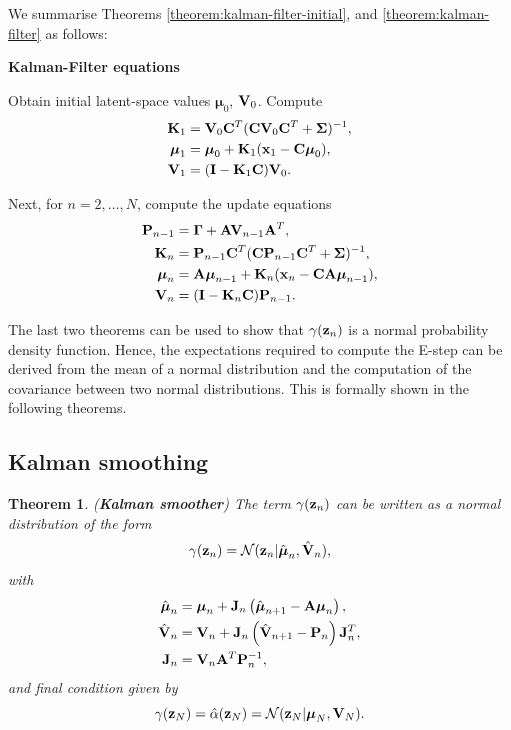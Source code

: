 \documentclass[12pt, oneside]{book}
\numberwithin{equation}{section}
\newcommand{\x}{{\bf x}}
\newcommand{\z}{{\bf z}}
\newcommand{\N}{\mathcal{N}}
\newtheorem{theorem}{Theorem}[section]
\begin{document}
{We summarise Theorems \ref{theorem:kalman-filter-initial}, and \ref{theorem:kalman-filter} as follows:
\begin{tcolorbox}
\textbf{Kalman-Filter equations}

	Obtain initial latent-space values $\boldsymbol{\mu}_0$, ${\bf V}_0$. Compute
	\begin{align}
		{\bf K}_1 &= {\bf V}_0{\bf C}^T({\bf C} {\bf V}_0 {\bf C}^T + \boldsymbol\Sigma)^{-1},\\
		\boldsymbol{\mu}_1 &= \boldsymbol{\mu}_0 + {\bf K}_1(\x_1 -{\bf C}\boldsymbol\mu_0),\\
		{\bf V}_1 &=  ({\bf I} - {\bf K}_1{\bf C}){\bf V}_0.
	\end{align}

	Next, for $n=2, \ldots, N$, compute the update equations
	\begin{align}
		{\bf P}_{n-1} &= \boldsymbol{\Gamma} + {\bf A}{\bf V}_{n-1}{\bf A}^T,\\
		{\bf K}_n &= {\bf P}_{n-1}{\bf C}^T({\bf C} {\bf P}_{n-1}{\bf C}^T + \boldsymbol\Sigma)^{-1},\\
		\boldsymbol{\mu}_n &= {\bf A}\boldsymbol{\mu}_{n-1} + {\bf K}_n(\x_n -{\bf C}{\bf A}\boldsymbol\mu_{n-1}),\\
		{\bf V}_n &=  ({\bf I} - {\bf K}_n{\bf C}){\bf P}_{n-1}.
	\end{align}
\end{tcolorbox}

The last two theorems can be used to show that $\gamma(\z_n)$ is a normal probability density function. Hence, the expectations required to compute the E-step can be derived from the mean of a normal distribution and the computation of the covariance between two normal distributions. This is formally shown in the following theorems.

\subsection{Kalman smoothing}
\begin{theorem} (\textbf{Kalman smoother}) \label{theorem:kalman-smoother}
	The term $\gamma(\z_n)$ can be written as a normal distribution of the form
	\begin{equation}
		\gamma(\z_n) = \N(\z_n\vert \hat{\boldsymbol\mu}_n, \hat{\bf V}_n),
	\end{equation}
	with
	\begin{align}
		\hat{\boldsymbol{\mu}}_n &= \boldsymbol{\mu}_n + {\bf J}_n\left(\hat{\boldsymbol \mu}_{n+1} - {\bf A}\boldsymbol\mu_n\right),\\
		\hat{\bf V}_n &= {\bf V}_n + {\bf J}_n\left(\hat{\bf V}_{n+1} - {\bf P}_n\right){\bf J}_n^T,\\
		{\bf J}_n &= {\bf V}_n{\bf A}^T{\bf P}_n^{-1},
	\end{align}
	and final condition given by
	\begin{equation}
		\gamma(\z_N) = \hat\alpha(\z_N) = \N(\z_N\vert \boldsymbol\mu_N, {\bf V}_N).
	\end{equation}
\end{theorem}

}
\end{document}

